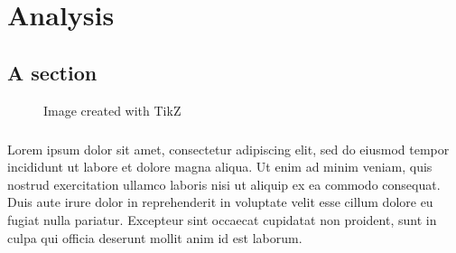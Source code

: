 
\chapter{Analysis}\label{ch:analysis}




\section{A section}


\begin{figure}[ht]
    \centering
    
    \caption{Image created with TikZ} \label{fig:T1}
\end{figure}

\paragraph{}
Lorem ipsum dolor sit amet, consectetur adipiscing elit, sed do eiusmod tempor incididunt ut labore et dolore magna aliqua. Ut enim ad minim veniam, quis nostrud exercitation ullamco laboris nisi ut aliquip ex ea commodo consequat. Duis aute irure dolor in reprehenderit in voluptate velit esse cillum dolore eu fugiat nulla pariatur. Excepteur sint occaecat cupidatat non proident, sunt in culpa qui officia deserunt mollit anim id est laborum.

